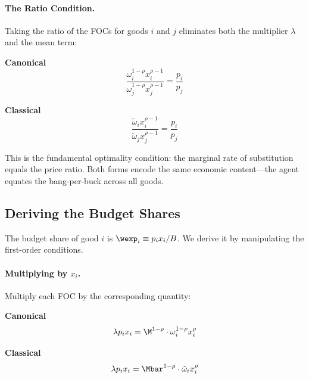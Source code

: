 \paragraph{The Ratio Condition.}
Taking the ratio of the FOCs for goods $i$ and $j$ eliminates both the multiplier $\lambda$ and the mean term:

\medskip
\noindent
\begin{minipage}[t]{0.48\textwidth}
\centering\textbf{Canonical}
\begin{equation}
\frac{\omega_i^{1-\rho} x_i^{\rho-1}}{\omega_j^{1-\rho} x_j^{\rho-1}} = \frac{p_i}{p_j}
\label{eq:ratio-canonical}
\end{equation}
\end{minipage}%
\hfill
\begin{minipage}[t]{0.48\textwidth}
\centering\textbf{Classical}
\begin{equation}
\frac{\tilde{\omega}_i x_i^{\rho-1}}{\tilde{\omega}_j x_j^{\rho-1}} = \frac{p_i}{p_j}
\label{eq:ratio-classical}
\end{equation}
\end{minipage}

\medskip
\noindent
This is the fundamental optimality condition: the marginal rate of substitution equals the price ratio. Both forms encode the same economic content---the agent equates the bang-per-buck across all goods.

\subsection{Deriving the Budget Shares}
\label{subsec:budget-shares}

The budget share of good $i$ is $\wexp_i \equiv p_i x_i / B$. We derive it by manipulating the first-order conditions.

\paragraph{Multiplying by $x_i$.}
Multiply each FOC by the corresponding quantity:

\medskip
\noindent
\begin{minipage}[t]{0.48\textwidth}
\centering\textbf{Canonical}
\begin{equation}
\lambda p_i x_i = \M^{1-\rho} \cdot \omega_i^{1-\rho} x_i^{\rho}
\label{eq:foc-times-x-canonical}
\end{equation}
\end{minipage}%
\hfill
\begin{minipage}[t]{0.48\textwidth}
\centering\textbf{Classical}
\begin{equation}
\lambda p_i x_i = \Mbar^{1-\rho} \cdot \tilde{\omega}_i x_i^{\rho}
\label{eq:foc-times-x-classical}
\end{equation}
\end{minipage}

